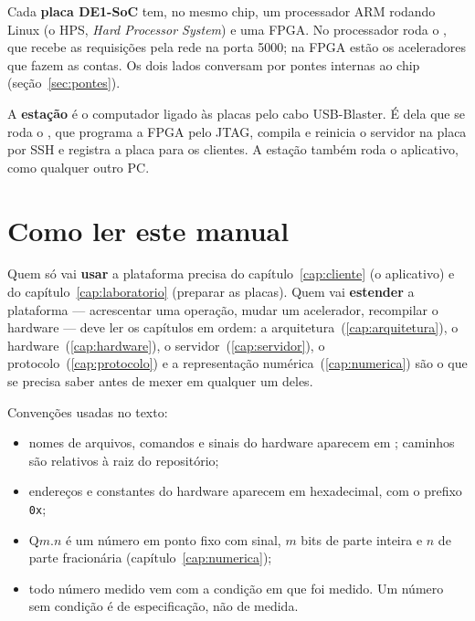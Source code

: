 Cada \textbf{placa DE1-SoC} tem, no mesmo chip, um processador ARM rodando Linux
(o HPS, \emph{Hard Processor System}) e uma FPGA. No processador roda o
, que recebe as requisições pela rede na porta 5000; na FPGA
estão os aceleradores que fazem as contas. Os dois lados conversam por pontes
internas ao chip (seção~\ref{sec:pontes}).

A \textbf{estação} é o computador ligado às placas pelo cabo USB-Blaster. É dela
que se roda o , que programa a FPGA pelo JTAG, compila e
reinicia o servidor na placa por SSH e registra a placa para os clientes. A
estação também roda o aplicativo, como qualquer outro PC.

\section{Como ler este manual}

Quem só vai \textbf{usar} a plataforma precisa do capítulo~\ref{cap:cliente}
(o aplicativo) e do capítulo~\ref{cap:laboratorio} (preparar as placas). Quem vai
\textbf{estender} a plataforma --- acrescentar uma operação, mudar um acelerador,
recompilar o hardware --- deve ler os capítulos em ordem: a
arquitetura~(\ref{cap:arquitetura}), o hardware~(\ref{cap:hardware}), o
servidor~(\ref{cap:servidor}), o protocolo~(\ref{cap:protocolo}) e a
representação numérica~(\ref{cap:numerica}) são o que se precisa saber antes de
mexer em qualquer um deles.

Convenções usadas no texto:

\begin{itemize}
  \item nomes de arquivos, comandos e sinais do hardware aparecem em
    ; caminhos são relativos à raiz do repositório;
  \item endereços e constantes do hardware aparecem em hexadecimal, com o
    prefixo \texttt{0x};
  \item \(\mathrm{Q}m.n\) é um número em ponto fixo com sinal, \(m\) bits de
    parte inteira e \(n\) de parte fracionária (capítulo~\ref{cap:numerica});
  \item todo número medido vem com a condição em que foi medido. Um número sem
    condição é de especificação, não de medida.
\end{itemize}

